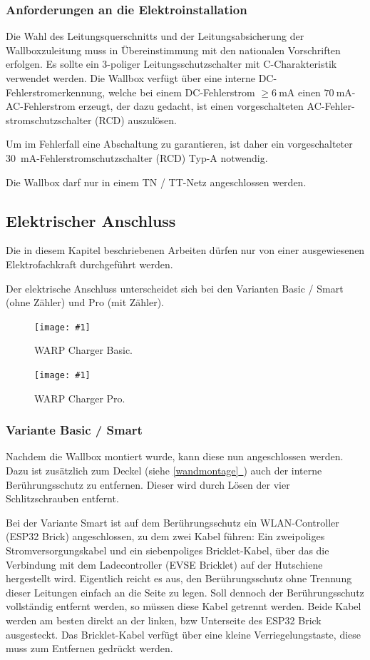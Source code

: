 \documentclass[a4paper,10pt]{article}
\newcommand{\hint}[1]{\begin{tcolorbox}[colback=boxgray,colframe=black,coltext=
white,title=Hinweis]#1\end{tcolorbox}}
\newcommand{\gfx}[1]{\texttt{[image: \#1]}}
\newcommand*{\fullref}[1]{\hyperref[{#1}]{\ref*{#1}~\nameref*{#1}}}
\begin{document}
\begin{multicols*}{2}
	\subsubsection{Anforderungen an die Elektroinstallation}
	Die Wahl des Leitungsquerschnitts und der Leitungsabsicherung der
	Wallboxzuleitung muss in Übereinstimmung mit den nationalen Vorschriften
	erfolgen. Es sollte ein 3-poliger Leitungsschutzschalter mit C-Charakteristik
	verwendet werden.
	Die Wallbox verfügt über eine interne DC-Fehlerstromerkennung, welche
	bei einem DC-Fehlerstrom $\geq \SI{6}{\milli\ampere}$ einen
	$\SI{70}{\milli\ampere}$-AC-Fehlerstrom erzeugt, der dazu gedacht, ist einen
	vorgeschalteten AC-Fehler-stromschutzschalter (RCD) auszulösen.
	\hint{Um im Fehlerfall eine Abschaltung zu garantieren, ist daher ein vorgeschalteter
		\SI{30}{\milli\ampere}-Fehlerstromschutzschalter (RCD) Typ-A notwendig.} Die Wallbox darf nur in einem TN / TT-Netz angeschlossen
	werden.

	\newpage
	\subsection{Elektrischer Anschluss}
	\hint{Die in diesem Kapitel beschriebenen Arbeiten dürfen nur von einer ausgewiesenen
		Elektrofachkraft durchgeführt werden.}
	Der elektrische Anschluss unterscheidet sich bei den Varianten Basic / Smart
	(ohne Zähler) und Pro (mit Zähler).

	\begin{figure}[H]
		\gfx{./img/resized/warp_basic_inlay_ready}
		\caption*{WARP Charger Basic.}
	\end{figure}

	\begin{figure}[H]
		\gfx{./img/resized/warp_pro_inlay_ready}
		\caption*{WARP Charger Pro.}
	\end{figure}

	\subsubsection{Variante Basic / Smart}
	Nachdem die Wallbox montiert wurde, kann diese nun angeschlossen werden. Dazu
	ist zusätzlich zum Deckel (siehe \fullref{wandmontage}) auch der interne
	Berührungsschutz zu entfernen. Dieser wird durch Lösen der vier
	Schlitzschrauben entfernt.

	Bei der Variante Smart ist auf dem Berührungsschutz ein WLAN-Controller (ESP32 Brick)
	angeschlossen, zu dem zwei Kabel führen: Ein zweipoliges
	Stromversorgungskabel und ein siebenpoliges Bricklet-Kabel, über das die Verbindung mit dem
	Ladecontroller (EVSE Bricklet) auf der Hutschiene hergestellt wird. Eigentlich reicht es aus,
	den Berührungsschutz ohne Trennung dieser Leitungen einfach an die Seite zu
	legen. Soll dennoch der Berührungsschutz vollständig entfernt werden, so
	müssen diese Kabel getrennt werden. Beide Kabel werden am besten direkt
	an der linken, bzw Unterseite des ESP32 Brick ausgesteckt.
	Das Bricklet-Kabel verfügt über eine kleine Verriegelungstaste,
	diese muss zum Entfernen gedrückt werden.


\end{multicols*}
\end{document}
